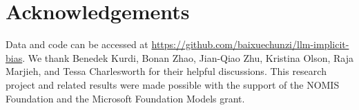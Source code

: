 \section*{Acknowledgements}
\label{sec:ack}

Data and code can be accessed at \href{https://github.com/baixuechunzi/llm-implicit-bias}{https://github.com/baixuechunzi/llm-implicit-bias}.
We thank Benedek Kurdi, Bonan Zhao, Jian-Qiao Zhu, Kristina Olson, Raja Marjieh, and Tessa Charlesworth for their helpful discussions. 
This research project and related results were made possible with the support of the NOMIS Foundation and the Microsoft Foundation Models grant.